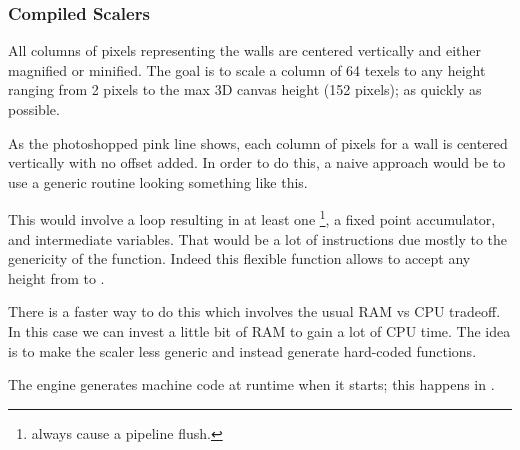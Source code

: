 \subsubsection{Compiled Scalers}
All columns of pixels representing the walls are centered vertically and either magnified or minified. The goal is to scale a column of 64 texels to any height ranging from 2 pixels to the max 3D canvas height (152 pixels); as quickly as possible.\\
\par
 \begin{figure}[H]
\centering
 \end{figure}
\par
As the photoshopped pink line shows, each column of pixels for a wall is centered vertically with no offset added. In order to do this, a naive approach would be to use a generic routine looking something like this.\\


\par
\begin{minipage}{\textwidth}

\end{minipage}

\par
This would involve a loop resulting in at least one \footnote{ always cause a pipeline flush.}, a fixed point accumulator, and intermediate variables. That would be a lot of instructions due mostly to the genericity of the function. Indeed this flexible function allows  to accept any height from  to .\\
\par
 There is a faster way to do this which involves the usual RAM vs CPU tradeoff. In this case we can invest a little bit of RAM to gain a lot of CPU time. The idea is to make the scaler less generic and instead generate hard-coded functions.\\
 \par 

\par
\begin{minipage}{\textwidth}

\end{minipage}

 The engine generates machine code at runtime when it starts; this happens in .\\
 
